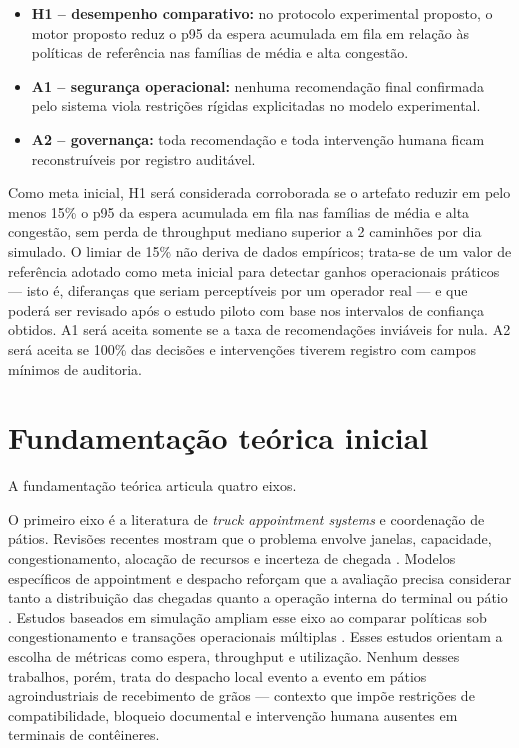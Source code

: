 \documentclass[
  12pt,
  oneside,
  a4paper,
  sumario=tradicional,
  brazil
]{abntex2}
\begin{document}
\begin{itemize}[leftmargin=1.27cm,itemsep=0pt,topsep=0pt,parsep=0pt,partopsep=0pt]
  \item \textbf{H1 -- desempenho comparativo:} no protocolo experimental proposto, o motor proposto reduz o p95 da espera acumulada em fila em rela\c{c}\~ao \`as pol\'iticas de refer\^encia nas fam\'ilias de m\'edia e alta congest\~ao.
  \item \textbf{A1 -- seguran\c{c}a operacional:} nenhuma recomenda\c{c}\~ao final confirmada pelo sistema viola restri\c{c}\~oes r\'igidas explicitadas no modelo experimental.
  \item \textbf{A2 -- governan\c{c}a:} toda recomenda\c{c}\~ao e toda interven\c{c}\~ao humana ficam reconstru\'iveis por registro audit\'avel.
\end{itemize}

Como meta inicial, H1 ser\'a considerada corroborada se o artefato reduzir em pelo menos 15\% o p95 da espera acumulada em fila nas fam\'ilias de m\'edia e alta congest\~ao, sem perda de throughput mediano superior a 2 caminh\~oes por dia simulado. O limiar de 15\% n\~ao deriva de dados emp\'iricos; trata-se de um valor de refer\^encia adotado como meta inicial para detectar ganhos operacionais pr\'aticos --- isto \'e, diferan\c{c}as que seriam percept\'iveis por um operador real --- e que poder\'a ser revisado ap\'os o estudo piloto com base nos intervalos de confian\c{c}a obtidos. A1 ser\'a aceita somente se a taxa de recomenda\c{c}\~oes invi\'aveis for nula. A2 ser\'a aceita se 100\% das decis\~oes e interven\c{c}\~oes tiverem registro com campos m\'inimos de auditoria.

\chapter{Fundamenta\c{c}\~ao te\'orica inicial}

A fundamenta\c{c}\~ao te\'orica articula quatro eixos.

O primeiro eixo \'e a literatura de \textit{truck appointment systems} e coordena\c{c}\~ao de p\'atios. Revis\~oes recentes mostram que o problema envolve janelas, capacidade, congestionamento, aloca\c{c}\~ao de recursos e incerteza de chegada \cite{Abdelmagid2022,Gracia2025}. Modelos espec\'ificos de appointment e despacho refor\c{c}am que a avalia\c{c}\~ao precisa considerar tanto a distribui\c{c}\~ao das chegadas quanto a opera\c{c}\~ao interna do terminal ou p\'atio \cite{Azab2017,Xu2021,Zhang2019}. Estudos baseados em simula\c{c}\~ao ampliam esse eixo ao comparar pol\'iticas sob congestionamento e transa\c{c}\~oes operacionais m\'ultiplas \cite{Bett2024}. Esses estudos orientam a escolha de m\'etricas como espera, throughput e utiliza\c{c}\~ao. Nenhum desses trabalhos, por\'em, trata do despacho local evento a evento em p\'atios agroindustriais de recebimento de gr\~aos --- contexto que imp\~oe restri\c{c}\~oes de compatibilidade, bloqueio documental e interven\c{c}\~ao humana ausentes em terminais de cont\^eineres.
\end{document}
